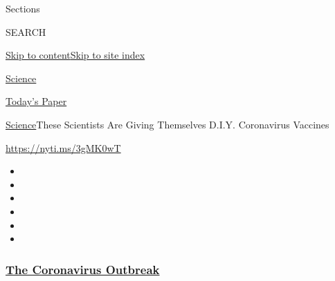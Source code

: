 Sections

SEARCH

\protect\hyperlink{site-content}{Skip to
content}\protect\hyperlink{site-index}{Skip to site index}

\href{https://www.nytimes3xbfgragh.onion/section/science}{Science}

\href{https://myaccount.nytimes3xbfgragh.onion/auth/login?response_type=cookie\&client_id=vi}{}

\href{https://www.nytimes3xbfgragh.onion/section/todayspaper}{Today's
Paper}

\href{/section/science}{Science}\textbar{}These Scientists Are Giving
Themselves D.I.Y. Coronavirus Vaccines

\url{https://nyti.ms/3gMK0wT}

\begin{itemize}
\item
\item
\item
\item
\item
\item
\end{itemize}

\hypertarget{the-coronavirus-outbreak}{%
\subsubsection{\texorpdfstring{\href{https://www.nytimes3xbfgragh.onion/news-event/coronavirus?name=styln-coronavirus-national\&region=TOP_BANNER\&block=storyline_menu_recirc\&action=click\&pgtype=Article\&impression_id=deaefbc0-f295-11ea-96c9-f92c07a4cad0\&variant=undefined}{The
Coronavirus
Outbreak}}{The Coronavirus Outbreak}}\label{the-coronavirus-outbreak}}

